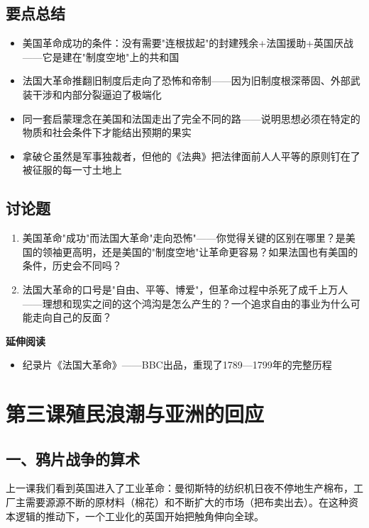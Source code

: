 \documentclass[a4paper,12pt]{ctexart}
\begin{document}
\subsection*{要点总结}
\begin{itemize}
  \item 美国革命成功的条件：没有需要"连根拔起"的封建残余+法国援助+英国厌战——它是建在"制度空地"上的共和国
  \item 法国大革命推翻旧制度后走向了恐怖和帝制——因为旧制度根深蒂固、外部武装干涉和内部分裂逼迫了极端化
  \item 同一套启蒙理念在美国和法国走出了完全不同的路——说明思想必须在特定的物质和社会条件下才能结出预期的果实
  \item 拿破仑虽然是军事独裁者，但他的《法典》把法律面前人人平等的原则钉在了被征服的每一寸土地上
\end{itemize}

\subsection*{讨论题}
\begin{enumerate}
  \item 美国革命"成功"而法国大革命"走向恐怖"——你觉得关键的区别在哪里？是美国的领袖更高明，还是美国的"制度空地"让革命更容易？如果法国也有美国的条件，历史会不同吗？
  \item 法国大革命的口号是"自由、平等、博爱"，但革命过程中杀死了成千上万人——理想和现实之间的这个鸿沟是怎么产生的？一个追求自由的事业为什么可能走向自己的反面？
\end{enumerate}

\vspace{0.3cm}
\textcolor{blue!70!black}{\textbf{延伸阅读}}
\begin{itemize}
  \item 纪录片《法国大革命》——BBC出品，重现了1789—1799年的完整历程
\end{itemize}

\newpage

\section{\textcolor{orange!80!black}{第三课\quad 殖民浪潮与亚洲的回应}}

\subsection*{一、鸦片战争的算术}

上一课我们看到英国进入了工业革命：曼彻斯特的纺织机日夜不停地生产棉布，工厂主需要源源不断的原材料（棉花）和不断扩大的市场（把布卖出去）。在这种资本逻辑的推动下，一个工业化的英国开始把触角伸向全球。
\end{document}
